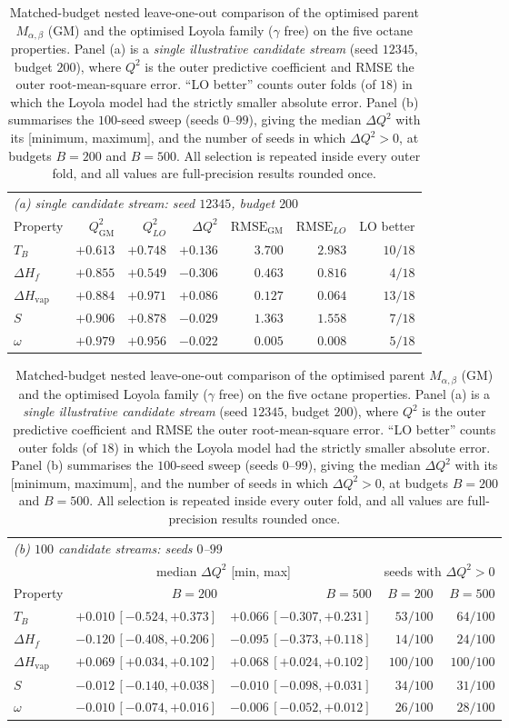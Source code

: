 \documentclass[a5paper, 10pt]{article}
\theoremstyle{plain}
\theoremstyle{remark}
\theoremstyle{definition}
\begin{document}
\begin{table}[tbp]
\centering
\caption{Matched-budget nested leave-one-out comparison of the
optimised parent $M_{\alpha,\beta}$ (GM) and the optimised Loyola
family ($\gamma$ free) on the five octane properties. Panel (a) is a
\emph{single illustrative candidate stream} (seed $12345$, budget
$200$), where $Q^2$ is the outer predictive coefficient and RMSE the
outer root-mean-square error. ``LO better'' counts outer folds
(of $18$) in which the Loyola model had the strictly smaller absolute
error. Panel (b) summarises the $100$-seed sweep (seeds $0$--$99$),
giving the median $\Delta Q^2$ with its [minimum, maximum], and the
number of seeds in which $\Delta Q^2 > 0$, at budgets $B = 200$ and
$B = 500$. All selection is repeated inside every outer
fold, and all values are full-precision results rounded once.}
\label{tab:ablation}
\small
\setlength{\tabcolsep}{5pt}
\begin{tabular}{lrrrrrr}
\toprule
\multicolumn{7}{l}{\emph{(a) single candidate stream: seed $12345$, budget $200$}}\\
Property & $Q^2_{\mathrm{GM}}$ & $Q^2_{LO}$ & $\Delta Q^2$ & $\mathrm{RMSE}_{\mathrm{GM}}$ & $\mathrm{RMSE}_{LO}$ & LO better\\
\midrule
$T_B$ & $+0.613$ & $+0.748$ & $+0.136$ & $3.700$ & $2.983$ & $10/18$\\
$\Delta H_f$ & $+0.855$ & $+0.549$ & $-0.306$ & $0.463$ & $0.816$ & $4/18$\\
$\Delta H_{\mathrm{vap}}$ & $+0.884$ & $+0.971$ & $+0.086$ & $0.127$ & $0.064$ & $13/18$\\
$S$ & $+0.906$ & $+0.878$ & $-0.029$ & $1.363$ & $1.558$ & $7/18$\\
$\omega$ & $+0.979$ & $+0.956$ & $-0.022$ & $0.005$ & $0.008$ & $5/18$\\
\bottomrule
\end{tabular}

\medskip
\footnotesize
\setlength{\tabcolsep}{4pt}
\begin{tabular}{lrrrr}
\toprule
\multicolumn{5}{l}{\emph{(b) $100$ candidate streams: seeds $0$--$99$}}\\
& \multicolumn{2}{c}{median $\Delta Q^2$ [min, max]} & \multicolumn{2}{c}{seeds with $\Delta Q^2 > 0$}\\
\cmidrule(lr){2-3}\cmidrule(lr){4-5}
Property & $B = 200$ & $B = 500$ & $B = 200$ & $B = 500$\\
\midrule
$T_B$ & $+0.010\,[-0.524,+0.373]$ & $+0.066\,[-0.307,+0.231]$ & $53/100$ & $64/100$\\
$\Delta H_f$ & $-0.120\,[-0.408,+0.206]$ & $-0.095\,[-0.373,+0.118]$ & $14/100$ & $24/100$\\
$\Delta H_{\mathrm{vap}}$ & $+0.069\,[+0.034,+0.102]$ & $+0.068\,[+0.024,+0.102]$ & $100/100$ & $100/100$\\
$S$ & $-0.012\,[-0.140,+0.038]$ & $-0.010\,[-0.098,+0.031]$ & $34/100$ & $31/100$\\
$\omega$ & $-0.010\,[-0.074,+0.016]$ & $-0.006\,[-0.052,+0.012]$ & $26/100$ & $28/100$\\
\bottomrule
\end{tabular}
\end{table}
\end{document}
